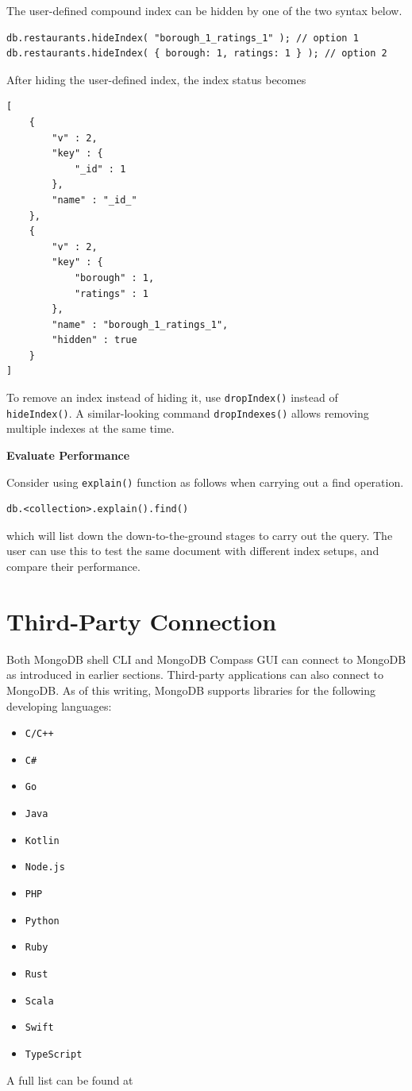 The user-defined compound index can be hidden by one of the two syntax below.
\begin{lstlisting}
db.restaurants.hideIndex( "borough_1_ratings_1" ); // option 1
db.restaurants.hideIndex( { borough: 1, ratings: 1 } ); // option 2
\end{lstlisting}

After hiding the user-defined index, the index status becomes
\begin{lstlisting}
[
	{
		"v" : 2,
		"key" : {
			"_id" : 1
		},
		"name" : "_id_"
	},
	{
		"v" : 2,
		"key" : {
			"borough" : 1,
			"ratings" : 1
		},
		"name" : "borough_1_ratings_1",
		"hidden" : true
	}
]
\end{lstlisting}

To remove an index instead of hiding it, use \verb|dropIndex()| instead of \verb|hideIndex()|. A similar-looking command \verb|dropIndexes()| allows removing multiple indexes at the same time.

\vspace{0.1in}
\noindent \textbf{Evaluate Performance}
\vspace{0.1in}

Consider using \verb|explain()| function as follows when carrying out a find operation.
\begin{lstlisting}
db.<collection>.explain().find()
\end{lstlisting}
which will list down the down-to-the-ground stages to carry out the query. The user can use this to test the same document with different index setups, and compare their performance.

\section{Third-Party Connection}

Both MongoDB shell CLI and MongoDB Compass GUI can connect to MongoDB as introduced in earlier sections. Third-party applications can also connect to MongoDB. As of this writing, MongoDB supports libraries for the following developing languages:
\begin{multicols}{4}
\begin{itemize}
	\item \verb|C/C++|
	\item \verb|C#|
	\item \verb|Go|
	\item \verb|Java|
	\item \verb|Kotlin|
	\item \verb|Node.js|
	\item \verb|PHP|
	\item \verb|Python|
	\item \verb|Ruby|
	\item \verb|Rust|
	\item \verb|Scala|
	\item \verb|Swift|
	\item \verb|TypeScript|
\end{itemize}
\end{multicols}
A full list can be found at \cite{driver2025mongo}

